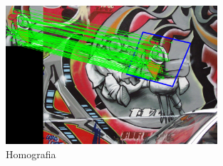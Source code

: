 	\begin{figure}[H]
		\centering
		\includegraphics[width=0.7\textwidth]{images/homography}
		\caption{Homografia}
	\end{figure}
